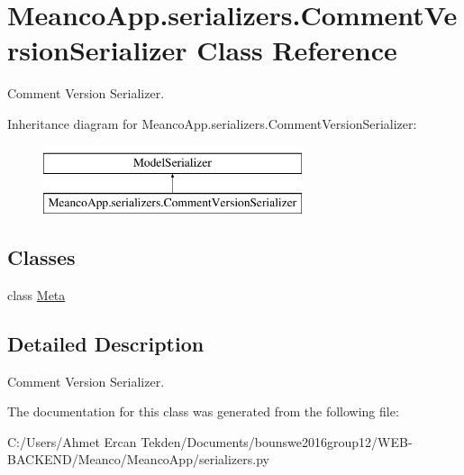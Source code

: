 \hypertarget{class_meanco_app_1_1serializers_1_1_comment_version_serializer}{}\section{Meanco\+App.\+serializers.\+Comment\+Version\+Serializer Class Reference}
\label{class_meanco_app_1_1serializers_1_1_comment_version_serializer}


Comment Version Serializer.  


Inheritance diagram for Meanco\+App.\+serializers.\+Comment\+Version\+Serializer\+:\begin{figure}[H]
\begin{center}
\leavevmode
\includegraphics[height=2.000000cm]{class_meanco_app_1_1serializers_1_1_comment_version_serializer}
\end{center}
\end{figure}
\subsection*{Classes}
\begin{DoxyCompactItemize}
\item 
class \hyperlink{class_meanco_app_1_1serializers_1_1_comment_version_serializer_1_1_meta}{Meta}
\end{DoxyCompactItemize}


\subsection{Detailed Description}
Comment Version Serializer. 

The documentation for this class was generated from the following file\+:\begin{DoxyCompactItemize}
\item 
C\+:/\+Users/\+Ahmet Ercan Tekden/\+Documents/bounswe2016group12/\+W\+E\+B-\/\+B\+A\+C\+K\+E\+N\+D/\+Meanco/\+Meanco\+App/serializers.\+py\end{DoxyCompactItemize}
